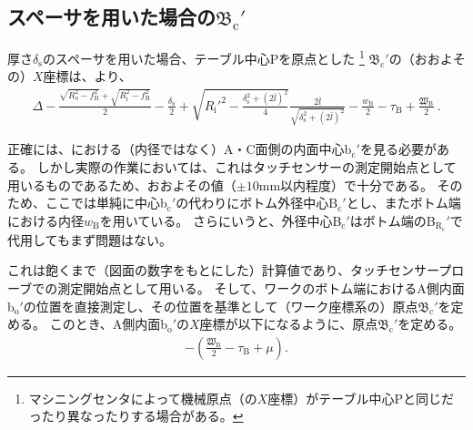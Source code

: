 \subsection[スペーサを用いた場合の\texorpdfstring{$\mathfrak B_\mathrm c'$}{Bc'}]
           {スペーサを用いた場合の$\boldsymbol{\mathfrak B_\mathrm c'}$}
厚さ$\delta_\mathrm s$のスペーサを用いた場合、テーブル中心Pを原点とした
\footnote{マシニングセンタによって機械原点（の$X$座標）がテーブル中心Pと同じだったり異なったりする場合がある。}\relax
\BottomOutcutCenter$\mathfrak B_\mathrm c'$の（おおよその）$X$座標は、より、
\begin{align*}
  \Delta-\frac{\sqrt{R_\mathrm o^2-f_\mathrm B^2}+\sqrt{R_\mathrm i^2-f_\mathrm B^2}}2-\frac{\delta_\mathrm s}2
  +\sqrt{R_\mathrm i'^2-\frac{\delta_\mathrm s^2+(2\bar l)^2}4}\frac{2\bar l}{\sqrt{\delta_\mathrm s^2+(2\bar l)^2}}
  -\frac{w_\mathrm B}2-\tau_\mathrm B+\frac{\mathfrak W_\mathrm B}2\ .
\end{align*}
\begin{hosoku}
正確には、\nameBottomEndFace における（内径ではなく）A・C面側の内面中心b$_\mathrm c'$を見る必要がある。
しかし実際の作業においては、これはタッチセンサーの測定開始点として用いるものであるため、おおよその値（$\pm10$mm以内程度）で十分である。
そのため、ここでは単純に中心b$_\mathrm c'$の代わりにボトム外径中心B$_\mathrm c'$とし、またボトム端における内径$w_\mathrm B$を用いている。
さらにいうと、外径中心B$_\mathrm c'$はボトム端の\nameCurvatureCenter B$_{\mathrm R_\mathrm c}'$で代用してもまず問題はない。
\end{hosoku}
これは飽くまで（図面の数字をもとにした）計算値であり、タッチセンサープローブでの測定開始点として用いる。
そして、ワークのボトム端におけるA側内面b$_\mathrm o'$の位置を直接測定し、その位置を基準として（ワーク座標系の）原点$\mathfrak B_\mathrm c'$を定める。
このとき、A側内面b$_\mathrm o'$の$X$座標が以下になるように、原点$\mathfrak B_\mathrm c'$を定める。
\begin{align*}
  -\left(\frac{\mathfrak W_\mathrm B}2-\tau_\mathrm B+\mu\right).
\end{align*}


